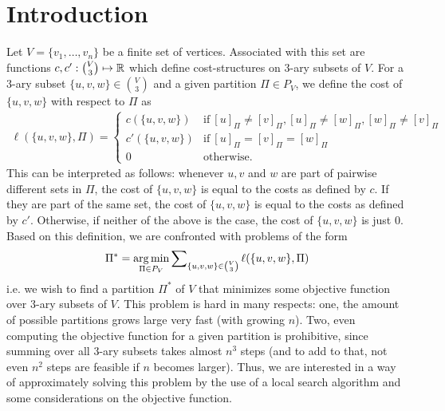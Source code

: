\section{Introduction}
Let $V = \{ v_1,\dots,v_n \}$ be a finite set of vertices. Associated with this set are functions $c,c': \binom{V}{3} \mapsto \mathbb{R}$ which define cost-structures on $3$-ary subsets of $V$. For a $3$-ary subset $\{u,v,w\} \in \binom{V}{3}$ and a given partition $\Pi \in P_V$, we define the cost of $\{u,v,w\}$ with respect to $\Pi$ as  
\begin{align*}
    \ell(\{u,v,w\},\Pi) = \begin{cases}
        c(\{u,v,w\}) & \text{if}\ [u]_\Pi \neq [v]_\Pi, [u]_\Pi \neq [w]_\Pi, [w]_\Pi \neq [v]_\Pi \\
        c'(\{u,v,w\}) & \text{if}\ [u]_\Pi = [v]_\Pi = [w]_\Pi \\
        0 & \text{otherwise.}
    \end{cases}
\end{align*}
This can be interpreted as follows: whenever $u,v$ and $w$ are part of pairwise different sets in $\Pi$, the cost of $\{u,v,w\}$ is equal to the costs as defined by $c$. If they are part of the same set, the cost of $\{u,v,w\}$ is equal to the costs as defined by $c'$. Otherwise, if neither of the above is the case, the cost of $\{u,v,w\}$ is just $0$. Based on this definition, we are confronted with problems of the form
\begin{align*}
    \Pi^* = \operatorname*{\arg\min}_{\Pi \in P_V} \sum\nolimits_{\{u,v,w\} \in \binom{V}{3}} \ell(\{u,v,w\},\Pi)
\end{align*}
i.e. we wish to find a partition $\Pi^*$ of $V$ that minimizes some objective function over $3$-ary subsets of $V$. This problem is hard in many respects: one, the amount of possible partitions grows large very fast (with growing $n$). Two, even computing the objective function for a given partition is prohibitive, since summing over all $3$-ary subsets takes almost $n^3$ steps (and to add to that, not even $n^2$ steps are feasible if $n$ becomes larger). Thus, we are interested in a way of approximately solving this problem by the use of a local search algorithm and some considerations on the objective function.
